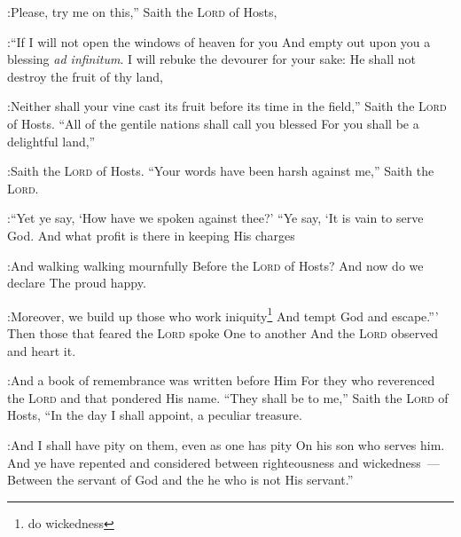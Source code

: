 \begin{enumerate}
:Please, try me on this,'' Saith the \textsc{Lord} of Hosts,%

:``If I will not open the windows of heaven for you And empty out upon you a blessing \emph{ad infinitum}.%
     I will rebuke the devourer for your sake: He shall not destroy the fruit of thy land,%

:Neither shall your vine cast its fruit before its time in the field,'' Saith the \textsc{Lord} of Hosts.%
     ``All of the gentile nations shall call you blessed For you shall be a delightful land,''%

:Saith the \textsc{Lord} of Hosts.%
     ``Your words have been harsh against me,'' Saith the \textsc{Lord}.%

:``Yet ye say, `How have we spoken against thee?'%
     ``Ye say, `It is vain to serve God. And what profit is there in keeping His charges%

:And walking walking mournfully Before the \textsc{Lord} of Hosts?%
     And now do we declare The proud happy.%

:Moreover, we build up those who work iniquity\footnote{do wickedness} And tempt God and escape.'''%
     Then those that feared the \textsc{Lord} spoke One to another And the \textsc{Lord} observed and heart it.%

:And a book of remembrance was written before Him For they who reverenced the \textsc{Lord} and that pondered His name.%
     ``They shall be to me,'' Saith the \textsc{Lord} of Hosts, ``In the day I shall appoint, a peculiar treasure.%

:And I shall have pity on them, even as one has pity On his son who serves him.%
     And ye have repented and considered between righteousness and wickedness~--- Between the servant of God and the he who is not His servant.''%
\end{enumerate}

